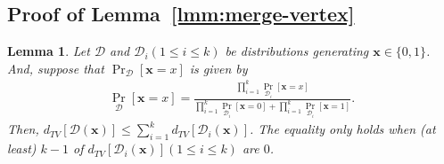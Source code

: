 \documentclass[letterpaper,11pt]{article}
\newtheorem{lemma}[theorem]{Lemma}
\newcommand{\dtv}{d_{TV}}
\newcommand{\cald}{\mathcal{D}}
\newcommand{\bfx}{\mathbf{x}}
\newcommand{\bit}{\{0,1\}}
\begin{document}
\subsection{Proof of Lemma~\ref{lmm:merge-vertex}}\label{apx:merge-vertex}
\begin{lemma}\label{lmm:product-tv}
  Let $\cald$ and $\cald_i (1\leq i\leq k)$ be distributions generating $\bfx\in \bit$.
  And, suppose that $\Pr_{\cald}[\bfx=x]$ is given by
  \begin{eqnarray*}
    \Pr_{\cald}[\bfx=x]=\frac{\prod_{i=1}^{k}\Pr_{\cald_i}[\bfx=x]}{\prod_{i=1}^{k}\Pr_{\cald_i}[\bfx=0]+\prod_{i=1}^{k}\Pr_{\cald_i}[\bfx=1]}.
  \end{eqnarray*}
  Then, $\dtv[\cald(\bfx)]\leq \sum_{i=1}^{k}\dtv[\cald_i(\bfx)]$.
  The equality only holds when (at least) $k-1$ of $\dtv[\cald_i(\bfx)](1\leq i \leq k)$ are $0$.
\end{lemma}
\end{document}
